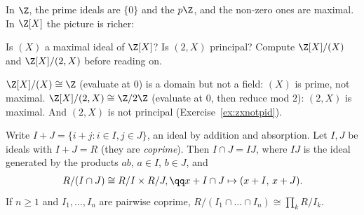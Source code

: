 In $\Z$, the prime ideals are $\{0\}$ and the $p\Z$, and the non-zero ones are maximal. In $\Z[X]$ the picture is richer:

\begin{think}
Is $(X)$ a maximal ideal of $\Z[X]$? Is $(2,X)$ principal? Compute $\Z[X]/(X)$ and $\Z[X]/(2,X)$ before reading on.
\end{think}

$\Z[X]/(X)\cong\Z$ (evaluate at $0$) is a domain but not a field: $(X)$ is prime, not maximal. $\Z[X]/(2,X)\cong\Z/2\Z$ (evaluate at $0$, then reduce mod $2$): $(2,X)$ is maximal. And $(2,X)$ is not principal (Exercise~\ref{ex:zxnotpid}).

\begin{theorem}\label{thm:crtring}
Write $I+J=\{i+j:i\in I,j\in J\}$, an ideal by addition and absorption.
Let $I,J$ be ideals with $I+J=R$ (they are \emph{coprime}). Then $I\cap J=IJ$, where $IJ$ is the ideal generated by the products $ab$, $a\in I$, $b\in J$, and
\[
\begin{gathered}R/(I\cap J)\cong R/I\times R/J,\qq x+I\cap J\mapsto(x+I,\,x+J).\end{gathered}
\]
If $n\ge1$ and $I_1,\dots,I_n$ are pairwise coprime, $R/(I_1\cap\dots\cap I_n)\cong\prod_kR/I_k$.
\end{theorem}
